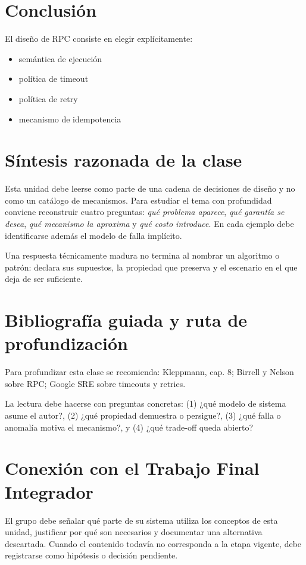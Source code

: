 \documentclass[variant=apuntes,cover=institutional,mode=screen]{ua-engineering-v6-article}
\begin{document}
\section{Conclusión}

\begin{uakeybox}
El diseño de RPC consiste en elegir explícitamente:
\begin{itemize}
\item semántica de ejecución
\item política de timeout
\item política de retry
\item mecanismo de idempotencia
\end{itemize}
\end{uakeybox}


\section{Síntesis razonada de la clase}
Esta unidad debe leerse como parte de una cadena de decisiones de diseño y no como un catálogo de mecanismos. Para estudiar el tema con profundidad conviene reconstruir cuatro preguntas: \emph{qué problema aparece}, \emph{qué garantía se desea}, \emph{qué mecanismo la aproxima} y \emph{qué costo introduce}. En cada ejemplo debe identificarse además el modelo de falla implícito.

\begin{uakeybox}
Una respuesta técnicamente madura no termina al nombrar un algoritmo o patrón: declara sus supuestos, la propiedad que preserva y el escenario en el que deja de ser suficiente.
\end{uakeybox}

\section{Bibliografía guiada y ruta de profundización}
Para profundizar esta clase se recomienda: Kleppmann, cap. 8; Birrell y Nelson sobre RPC; Google SRE sobre timeouts y retries.

La lectura debe hacerse con preguntas concretas: (1) ¿qué modelo de sistema asume el autor?, (2) ¿qué propiedad demuestra o persigue?, (3) ¿qué falla o anomalía motiva el mecanismo?, y (4) ¿qué trade-off queda abierto?

\section{Conexión con el Trabajo Final Integrador}
El grupo debe señalar qué parte de su sistema utiliza los conceptos de esta unidad, justificar por qué son necesarios y documentar una alternativa descartada. Cuando el contenido todavía no corresponda a la etapa vigente, debe registrarse como hipótesis o decisión pendiente.
\end{document}
